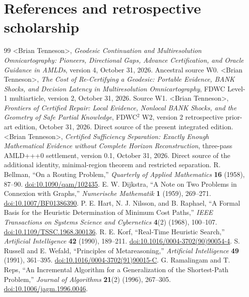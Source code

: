 \documentclass[11pt,letterpaper]{article}
\theoremstyle{definition}
\theoremstyle{remark}
\newcommand{\bn}{\textless{}Brian Tenneson\textgreater{}}
\begin{document}
\section{References and retrospective scholarship}
\begin{thebibliography}{99}\setlength{\itemsep}{.25em}\small
{} \bn, \emph{Geodesic Continuation and Multiresolution Omnicartography: Pioneers, Directional Gaps, Advance Certification, and Oracle Guidance in AMLDs}, version 4, October 31, 2026. Ancestral source W0.
 \bn, \emph{The Cost of Re-Certifying a Geodesic: Portable Evidence, BANK Shocks, and Decision Latency in Multiresolution Omnicartography}, FDWC Level-1 multiarticle, version 2, October 31, 2026. Source W1.
 \bn, \emph{Frontiers of Certified Repair: Local Evidence, Nonlocal BANK Shocks, and the Geometry of Safe Partial Knowledge}, FDWC$^2$ W2, version 2 retrospective prior-art edition, October 31, 2026. Direct source of the present integrated edition.
 \bn, \emph{Certified Sufficiency Separation: Exactly Enough Mathematical Evidence without Complete Horizon Reconstruction}, three-pass AMLD+++0 settlement, version 0.1, October 31, 2026. Direct source of the additional identity, minimal-region theorem and restricted separation.
 R. Bellman, ``On a Routing Problem,'' \emph{Quarterly of Applied Mathematics} \textbf{16} (1958), 87--90. \href{https://doi.org/10.1090/qam/102435}{doi:10.1090/qam/102435}.
 E. W. Dijkstra, ``A Note on Two Problems in Connexion with Graphs,'' \emph{Numerische Mathematik} \textbf{1} (1959), 269--271. \href{https://doi.org/10.1007/BF01386390}{doi:10.1007/BF01386390}.
 P. E. Hart, N. J. Nilsson, and B. Raphael, ``A Formal Basis for the Heuristic Determination of Minimum Cost Paths,'' \emph{IEEE Transactions on Systems Science and Cybernetics} \textbf{4}(2) (1968), 100--107. \href{https://doi.org/10.1109/TSSC.1968.300136}{doi:10.1109/TSSC.1968.300136}.
 R. E. Korf, ``Real-Time Heuristic Search,'' \emph{Artificial Intelligence} \textbf{42} (1990), 189--211. \href{https://doi.org/10.1016/0004-3702(90)90054-4}{doi:10.1016/0004-3702(90)90054-4}.
 S. Russell and E. Wefald, ``Principles of Metareasoning,'' \emph{Artificial Intelligence} \textbf{49} (1991), 361--395. \href{https://doi.org/10.1016/0004-3702(91)90015-C}{doi:10.1016/0004-3702(91)90015-C}.
 G. Ramalingam and T. Reps, ``An Incremental Algorithm for a Generalization of the Shortest-Path Problem,'' \emph{Journal of Algorithms} \textbf{21}(2) (1996), 267--305. \href{https://doi.org/10.1006/jagm.1996.0046}{doi:10.1006/jagm.1996.0046}.

\end{thebibliography}
\end{document}
